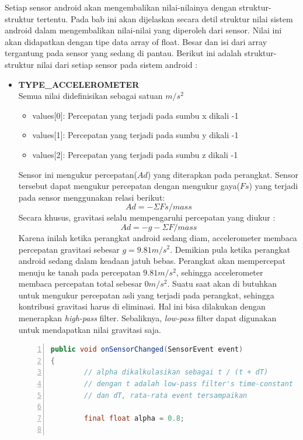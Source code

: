 \documentclass[a4paper,twoside]{article}
\begin{document}
\begin{enumerate}
\label{sssec:struktur_nilai_yang_dikembalikan_oleh_sensor}
Setiap sensor android akan mengembalikan nilai-nilainya dengan struktur-struktur tertentu. Pada bab ini akan dijelaskan secara detil struktur nilai sistem android dalam mengembalikan nilai-nilai yang diperoleh dari sensor. Nilai ini akan didapatkan dengan tipe data array of float. Besar dan isi dari array tergantung pada sensor yang sedang di pantau. Berikut ini adalah struktur-struktur nilai dari setiap sensor pada sistem android :\\
\begin{itemize}
	\item \textbf{TYPE\_ACCELEROMETER}\\
Semua nilai didefinisikan sebagai satuan \(m/s^2\)
\begin{itemize}
	\item values[0]: Percepatan yang terjadi pada sumbu x dikali -1
	\item values[1]: Percepatan yang terjadi pada sumbu y dikali -1
	\item values[2]: Percepatan yang terjadi pada sumbu z dikali -1
\end{itemize}
Sensor ini mengukur percepatan(\(Ad\)) yang diterapkan pada perangkat. Sensor tersebut dapat mengukur percepatan dengan mengukur gaya(\(Fs\)) yang terjadi pada sensor menggunakan relasi berikut:
\[
	Ad = -\Sigma Fs / mass
\]
Secara khusus, gravitasi selalu mempengaruhi percepatan yang diukur :
\[
	Ad =  -g -\Sigma F / mass
\]
Karena inilah ketika perangkat android sedang diam, accelerometer membaca percepatan gravitasi sebesar \(g = 9.81m/s^2\).
Demikian pula ketika perangkat android sedang dalam keadaan jatuh bebas. Perangkat akan mempercepat menuju ke tanah pada percepatan \(9.81 m/s^2\), sehingga accelerometer membaca percepatan total sebesar \( 0 m/s^2\). 
Suatu saat akan di butuhkan untuk mengukur percepatan asli yang terjadi pada perangkat, sehingga kontribusi gravitasi harus di eliminasi. Hal ini bisa dilakukan dengan menerapkan \textit{high-pass} filter. Sebaliknya, \textit{low-pass} filter dapat digunakan untuk mendapatkan nilai gravitasi saja. 
\begin{lstlisting}[language=java,numbers=left,breaklines=true,caption={Implementasi \textit{low-pass} filter},label={lst:low-pass-filter},language=java]
public void onSensorChanged(SensorEvent event)
{
		// alpha dikalkulasikan sebagai t / (t + dT)
		// dengan t adalah low-pass filter's time-constant
		// dan dT, rata-rata event tersampaikan

		final float alpha = 0.8;


\end{lstlisting}
\end{itemize}
\end{enumerate}
\end{document}
